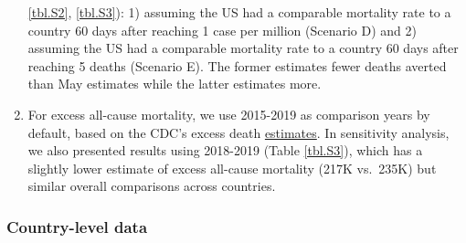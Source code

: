 \documentclass[
]{article}
\begin{document}
\begin{enumerate}
  \ref{tbl.S2}, \ref{tbl.S3}): 1) assuming the US had a comparable
  mortality rate to a country 60 days after reaching 1 case per million
  (Scenario D) and 2) assuming the US had a comparable mortality rate to
  a country 60 days after reaching 5 deaths (Scenario E). The former
  estimates fewer deaths averted than May estimates while the latter
  estimates more.
\item
  For excess all-cause mortality, we use 2015-2019 as comparison years
  by default, based on the CDC's excess death
  \href{https://www.cdc.gov/nchs/nvss/vsrr/covid19/excess_deaths.htm#data-tables}{estimates}.
  In sensitivity analysis, we also presented results using 2018-2019
  (Table \ref{tbl.S3}), which has a slightly lower estimate of excess
  all-cause mortality (217K vs.~235K) but similar overall comparisons
  across countries.
\end{enumerate}

\bigskip

\hypertarget{country-level-data}{%
\subsubsection{Country-level data}\label{country-level-data}}
\end{document}
